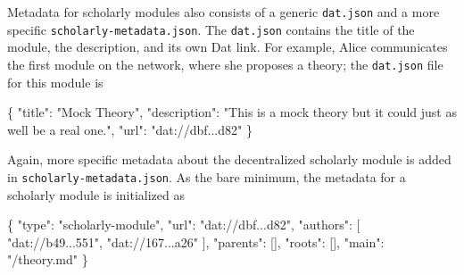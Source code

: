 \documentclass[publications,article,submit,moreauthors,pdftex,10pt,a4paper]{Definitions/mdpi}
\newenvironment{Shaded}{\begin{snugshade}}{\end{snugshade}}
\newcommand{\DataTypeTok}[1]{\textcolor[rgb]{0.13,0.29,0.53}{#1}}
\newcommand{\FunctionTok}[1]{\textcolor[rgb]{0.00,0.00,0.00}{#1}}
\newcommand{\OtherTok}[1]{\textcolor[rgb]{0.56,0.35,0.01}{#1}}
\newcommand{\StringTok}[1]{\textcolor[rgb]{0.31,0.60,0.02}{#1}}
\begin{document}
Metadata for scholarly modules also consists of a generic
\texttt{dat.json} and a more specific \texttt{scholarly-metadata.json}.
The \texttt{dat.json} contains the title of the module, the description,
and its own Dat link. For example, Alice communicates the first module
on the network, where she proposes a theory; the \texttt{dat.json} file
for this module is


\begin{Shaded}
\begin{Highlighting}[]
\FunctionTok{\{}
  \DataTypeTok{"title"}\FunctionTok{:} \StringTok{"Mock Theory"}\FunctionTok{,}
  \DataTypeTok{"description"}\FunctionTok{:} \StringTok{"This is a mock theory but it could just as well be}
  \StringTok{a real one."}\FunctionTok{,}
  \DataTypeTok{"url"}\FunctionTok{:} \StringTok{"dat://dbf...d82"}
\FunctionTok{\}}
\end{Highlighting}
\end{Shaded}

Again, more specific metadata about the decentralized scholarly module
is added in \texttt{scholarly-metadata.json}. As the bare minimum, the
metadata for a scholarly module is initialized as

\begin{Shaded}
\begin{Highlighting}[]
\FunctionTok{\{}
  \DataTypeTok{"type"}\FunctionTok{:} \StringTok{"scholarly-module"}\FunctionTok{,}
  \DataTypeTok{"url"}\FunctionTok{:} \StringTok{"dat://dbf...d82"}\FunctionTok{,}
  \DataTypeTok{"authors"}\FunctionTok{:} \OtherTok{[}
    \StringTok{"dat://b49...551"}\OtherTok{,}
    \StringTok{"dat://167...a26"}
  \OtherTok{]}\FunctionTok{,}
  \DataTypeTok{"parents"}\FunctionTok{:} \OtherTok{[]}\FunctionTok{,}
  \DataTypeTok{"roots"}\FunctionTok{:} \OtherTok{[]}\FunctionTok{,}
  \DataTypeTok{"main"}\FunctionTok{:} \StringTok{"/theory.md"}
\FunctionTok{\}}
\end{Highlighting}
\end{Shaded}
\end{document}
